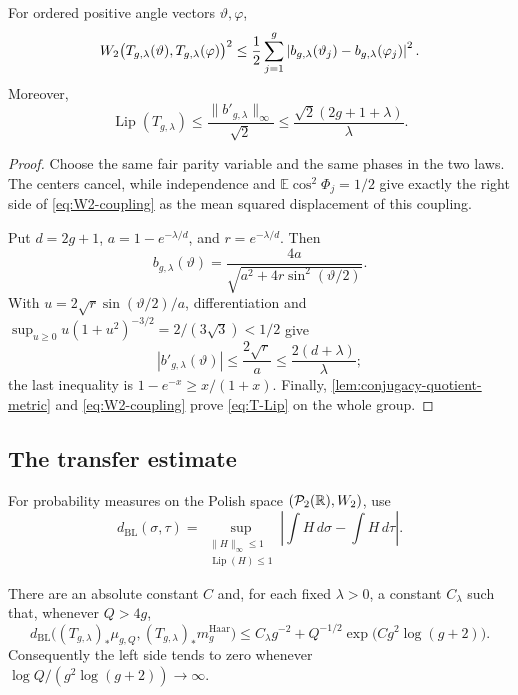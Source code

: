 \begin{lemma}
\label{lem:T-lipschitz}
For ordered positive angle vectors \(\vartheta,\varphi\),
\begin{equation}
 W_2\bigl(T_{g,\lambda}(\vartheta),T_{g,\lambda}(\varphi)\bigr)^2
 \le \frac12\sum_{j=1}^g
 \left|b_{g,\lambda}(\vartheta_j)
             -b_{g,\lambda}(\varphi_j)\right|^2.
\label{eq:W2-coupling}
\end{equation}
Moreover,
\begin{equation}
 \operatorname{Lip}(T_{g,\lambda})
 \le \frac{\|b'_{g,\lambda}\|_\infty}{\sqrt2}
 \le \frac{\sqrt2(2g+1+\lambda)}{\lambda}.
\label{eq:T-Lip}
\end{equation}
\end{lemma}

\begin{proof}
Choose the same fair parity variable and the same phases in the two laws.
The centers cancel, while independence and
\(\mathbb E\cos^2\Phi_j=1/2\) give exactly the right side of
\eqref{eq:W2-coupling} as the mean squared displacement of this coupling.

Put \(d=2g+1\), \(a=1-e^{-\lambda/d}\), and
\(r=e^{-\lambda/d}\).  Then
\[
 b_{g,\lambda}(\vartheta)
 =\frac{4a}{\sqrt{a^2+4r\sin^2(\vartheta/2)}}.
\]
With \(u=2\sqrt r\sin(\vartheta/2)/a\), differentiation and
\(\sup_{u\ge0}u(1+u^2)^{-3/2}=2/(3\sqrt3)<1/2\) give
\[
 |b'_{g,\lambda}(\vartheta)|\le\frac{2\sqrt r}{a}
 \le\frac{2(d+\lambda)}{\lambda};
\]
the last inequality is \(1-e^{-x}\ge x/(1+x)\).  Finally,
\cref{lem:conjugacy-quotient-metric} and \eqref{eq:W2-coupling} prove
\eqref{eq:T-Lip} on the whole group.
\end{proof}

\subsection{The transfer estimate}

For probability measures on the Polish space \((\mathcal P_2(\mathbb R),W_2)\), use
\[
 d_{\mathrm{BL}}(\sigma,\tau)
 =\sup_{\substack{\|H\|_\infty\le1\\ \operatorname{Lip}(H)\le1}}
 \left|\int H\,d\sigma-\int H\,d\tau\right|.
\]

\begin{proposition}
\label{prop:arithmetic-haar-transfer}
There are an absolute constant \(C\) and, for each fixed \(\lambda>0\), a
constant \(C_\lambda\) such that, whenever \(Q>4g\),
\begin{equation}
 d_{\mathrm{BL}}\bigl((T_{g,\lambda})_*\mu_{g,Q},
                       (T_{g,\lambda})_*m_g^{\mathrm{Haar}}\bigr)
 \le C_\lambda g^{-2}
   +Q^{-1/2}\exp\!\bigl(Cg^2\log(g+2)\bigr).
\label{eq:BL-transfer}
\end{equation}
Consequently the left side tends to zero whenever
\(\log Q/(g^2\log(g+2))\to\infty\).
\end{proposition}

